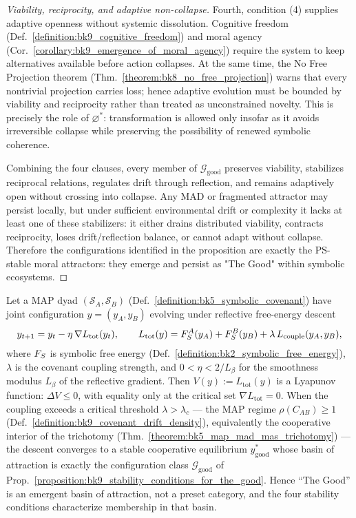 \begin{proof}[Viability, reciprocity, and adaptive non-collapse]
Fourth, condition (4) supplies adaptive openness without systemic dissolution.
Cognitive freedom (Def.~\ref{definition:bk9_cognitive_freedom}) and moral
agency (Cor.~\ref{corollary:bk9_emergence_of_moral_agency}) require the system
to keep alternatives available before action collapses.  At the same time, the
No Free Projection theorem (Thm.~\ref{theorem:bk8_no_free_projection}) warns
that every nontrivial projection carries loss; hence adaptive evolution must be
bounded by viability and reciprocity rather than treated as unconstrained
novelty.  This is precisely the role of \(\varnothing^*\): transformation is
allowed only insofar as it avoids irreversible collapse while preserving the
possibility of renewed symbolic coherence.

Combining the four clauses, every member of
\(\mathcal{G}_{\mathrm{good}}\) preserves viability, stabilizes reciprocal
relations, regulates drift through reflection, and remains adaptively open
without crossing into collapse.  Any MAD or fragmented attractor may persist
locally, but under sufficient environmental drift or complexity it lacks at
least one of these stabilizers: it either drains distributed viability,
contracts reciprocity, loses drift/reflection balance, or cannot adapt without
collapse.  Therefore the configurations identified in the proposition are
exactly the PS-stable moral attractors: they emerge and persist as "The Good"
within symbolic ecosystems.
\end{proof}

\begin{theorem}
\label{theorem:bk9_good_as_lyapunov_basin}
Let a MAP dyad $(\mathcal{S}_A,\mathcal{S}_B)$
(Def.~\ref{definition:bk5_symbolic_covenant}) have joint configuration
$y=(y_A,y_B)$ evolving under reflective free-energy descent
\[
y_{t+1} = y_t - \eta\,\nabla L_{\mathrm{tot}}(y_t),
\qquad
L_{\mathrm{tot}}(y) = F_S^{A}(y_A) + F_S^{B}(y_B)
+ \lambda\, L_{\mathrm{couple}}(y_A,y_B),
\]
where $F_S$ is symbolic free energy
(Def.~\ref{definition:bk2_symbolic_free_energy}), $\lambda$ is the covenant
coupling strength, and $0<\eta<2/L_\beta$ for the smoothness modulus $L_\beta$ of
the reflective gradient. Then $V(y):=L_{\mathrm{tot}}(y)$ is a Lyapunov function:
$\Delta V \le 0$, with equality only at the critical set $\nabla L_{\mathrm{tot}}=0$.
When the coupling exceeds a critical threshold $\lambda>\lambda_c$ --- the MAP
regime $\rho(C_{AB})\ge 1$ (Def.~\ref{definition:bk9_covenant_drift_density}),
equivalently the cooperative interior of the trichotomy
(Thm.~\ref{theorem:bk5_map_mad_mas_trichotomy}) --- the descent converges to a
stable cooperative equilibrium $y^\ast_{\mathrm{good}}$ whose basin of attraction
is exactly the configuration class $\mathcal{G}_{\mathrm{good}}$ of
Prop.~\ref{proposition:bk9_stability_conditions_for_the_good}. Hence ``The Good''
is an emergent basin of attraction, not a preset category, and the four
stability conditions characterize membership in that basin.
\end{theorem}

